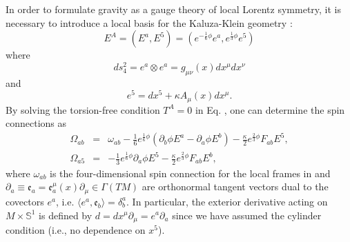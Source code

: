 \documentclass[12pt,epsf]{article}
\begin{document}
In order to formulate gravity as a gauge theory of local Lorentz symmetry,
it is necessary to introduce a local basis
for the Kaluza-Klein geometry :
\begin{equation}\label{5-viel}
  E^A = (E^a, E^5) = ( e^{-\frac{1}{6} \phi} e^a,  e^{\frac{1}{3} \phi} e^5 )
\end{equation}
where
\begin{equation}\label{4-vier}
 ds_4^2 = e^a \otimes e^a = g_{\mu\nu} (x) dx^\mu dx^\nu
\end{equation}
and
\begin{equation}\label{5th-e}
  e^5 = dx^5 + \kappa A_\mu (x) dx^\mu.
\end{equation}
By solving the torsion-free condition $T^A=0$ in Eq. ,
one can determine the spin connections as
\begin{eqnarray} \label{kk-spin}
  \Omega_{ab} &=& \omega_{ab} - \frac{1}{6}e^{\frac{1}{6} \phi} (\partial_b \phi E^a - \partial_a \phi E^b)
  - \frac{\kappa}{2} e^{\frac{2}{3} \phi} F_{ab} E^5, \\
  \Omega_{a5} &=& - \frac{1}{3} e^{\frac{1}{6} \phi} \partial_a \phi E^5
  - \frac{\kappa}{2} e^{\frac{2}{3} \phi} F_{ab} E^b,
\end{eqnarray}
where $\omega_{ab}$ is the four-dimensional spin connection for the local frames in 
and $\partial_a \equiv \mathfrak{e}_a = \mathfrak{e}_a^\mu (x) \partial_\mu \in \Gamma(TM)$ are orthonormal tangent vectors
dual to the covectors $e^a$, i.e. $\langle e^a, \mathfrak{e}_b \rangle = \delta^a_b$.
In particular, the exterior derivative acting on $M \times \mathbb{S}^1$ is defined by
$d = dx^\mu \partial_\mu = e^a \partial_a$ since we have assumed the cylinder condition (i.e., no dependence on $x^5$).
\end{document}
